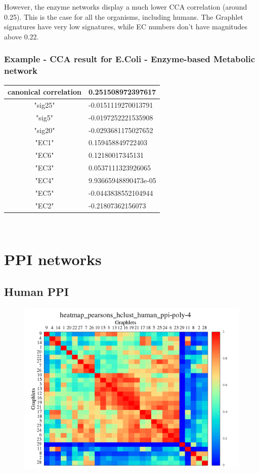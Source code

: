 \documentclass[11pt,a4paper,oneside]{report}
\begin{document}
However, the enzyme networks display a much lower CCA correlation (around 0.25). This is the case for all the organisms, including humans. The Graphlet signatures have very low signatures, while EC numbers don't have magnitudes above 0.22.

\subsubsection*{Example - CCA result for E.Coli - Enzyme-based Metabolic network}


\begin{tabular}{ c | l }
canonical correlation &  0.251508972397617\\
\hline
"sig25" & -0.0151119270013791\\
"sig5" & -0.0197252221535908\\
"sig20" & -0.0293681175027652\\
\hline
"EC1" & 0.159458849722403\\
"EC6" & 0.12180017345131\\
"EC3" & 0.0537111323926065\\
"EC4" & 9.93665948890473e-05\\
"EC5" & -0.0443838552104944\\
"EC2" & -0.21807362156073\\
\end{tabular}\\

\section*{PPI networks}
\subsection*{Human PPI}


\begin{figure}[H]
  \centering
\includegraphics[scale=0.4]
{../code/final_results/human_ppi/heatmap_pearsons_hclust_human_ppi-poly-4.png}
\caption{}
\label{fig:human_ppi}
\end{figure}
\end{document}
